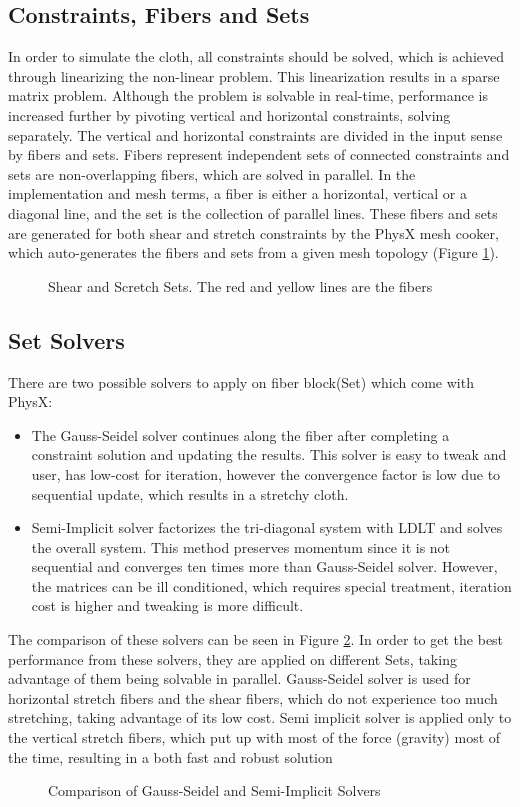 \subsection{Constraints, Fibers and Sets}
In order to simulate the cloth, all constraints should be solved, which is achieved through linearizing the non-linear problem. This linearization results in a sparse matrix problem. Although the problem is solvable in real-time, performance is increased further by pivoting vertical and horizontal constraints, solving separately. The vertical and horizontal constraints are divided in the input sense by fibers and sets. Fibers represent independent sets of connected constraints and sets are non-overlapping fibers, which are solved in parallel. In the implementation and mesh terms, a fiber is either a horizontal, vertical or a diagonal line, and the set is the collection of parallel lines. These fibers and sets are generated for both shear and stretch constraints by the PhysX mesh cooker, which auto-generates the fibers and sets from a given mesh topology (Figure \ref{fig:shear_strech_sets}). 

\begin{figure}[h]
\centerline{}
\caption{Shear and Scretch Sets. The red and yellow lines are the fibers \cite{Kim2011}}
\label{fig:shear_strech_sets}
\end{figure}

\subsection{Set Solvers}
There are two possible solvers to apply on fiber block(Set) which come with PhysX:
\begin{itemize}
  \item The Gauss-Seidel solver continues along the fiber after completing a constraint solution and updating the results. This solver is easy to tweak and user, has low-cost for iteration, however the convergence factor is low due to sequential update, which results in a stretchy cloth.
  \item Semi-Implicit solver factorizes the tri-diagonal system with LDLT and solves the overall system. This method preserves momentum since it is not sequential and converges ten times more than Gauss-Seidel solver. However, the matrices can be ill conditioned, which requires special treatment, iteration cost is higher and tweaking is more difficult.
\end{itemize}
The comparison of these solvers can be seen in Figure \ref{fig:solver_comparison}. In order to get the best performance from these solvers, they are applied on different Sets, taking advantage of them being solvable in parallel. Gauss-Seidel solver is used for horizontal stretch fibers and the shear fibers, which do not experience too much stretching, taking advantage of its low cost. Semi implicit solver is applied only to the vertical stretch fibers, which put up with most of the force (gravity) most of the time, resulting in a both fast and robust solution

\begin{figure}[h]
\centerline{}
\caption{Comparison of Gauss-Seidel and Semi-Implicit Solvers \cite{Kim2011}}
\label{fig:solver_comparison}
\end{figure}


